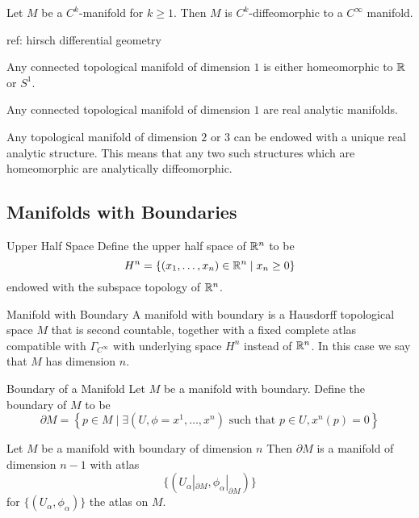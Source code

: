 \documentclass[a4paper]{article}
\begin{document}
\begin{thm}{}{} Let $M$ be a $C^k$-manifold for $k\geq 1$. Then $M$ is $C^k$-diffeomorphic to a $C^\infty$ manifold. 
\end{thm}

ref: hirsch differential geometry

\begin{thm}{}{} Any connected topological manifold of dimension $1$ is either homeomorphic to $\mathbb{R}$ or $S^1$. 
\end{thm}

\begin{thm}{}{} Any connected topological manifold of dimension $1$ are real analytic manifolds. 
\end{thm}

\begin{thm}{}{} Any topological manifold of dimension $2$ or $3$ can be endowed with a unique real analytic structure. This means that any two such structures which are homeomorphic are analytically diffeomorphic. 
\end{thm}

\subsection{Manifolds with Boundaries}
\begin{defn}{Upper Half Space}{} Define the upper half space of $\mathbb{R}^n$ to be $$H^n=\{(x_1,\dots,x_n)\in\mathbb{R}^n\;|\;x_n\geq 0\}$$ endowed with the subspace topology of $\mathbb{R}^n$. 
\end{defn}

\begin{defn}{Manifold with Boundary}{} A manifold with boundary is a Hausdorff topological space $M$ that is second countable, together with a fixed complete atlas compatible with $\Gamma_{C^\infty}$ with underlying space $H^n$ instead of $\mathbb{R}^n$. In this case we say that $M$ has dimension $n$. 
\end{defn}

\begin{defn}{Boundary of a Manifold}{} Let $M$ be a manifold with boundary. Define the boundary of $M$ to be $$\partial M=\left\{p\in M\;|\;\exists(U,\phi=x^1,\dots,x^n)\text{ such that }p\in U, x^n(p)=0\right\}$$
\end{defn}

\begin{prp}{}{} Let $M$ be a manifold with boundary of dimension $n$ Then $\partial M$ is a manifold of dimension $n-1$ with atlas $$\{(U_\alpha|_{\partial M},\phi_\alpha|_{\partial M})\}$$ for $\{(U_\alpha,\phi_\alpha)\}$ the atlas on $M$. 
\end{prp}
\end{document}
